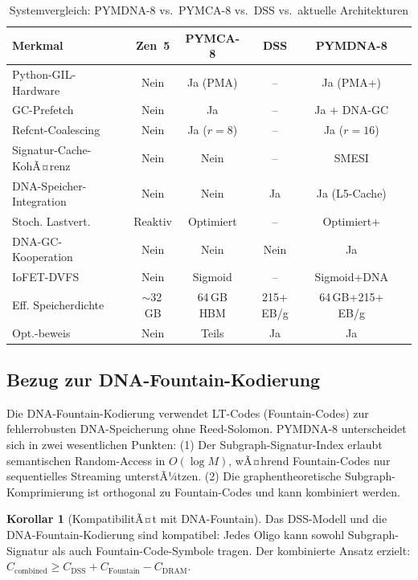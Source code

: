 ﻿\documentclass[a4paper,12pt]{article}
\theoremstyle{definition}
\newtheorem{korollar}{Korollar}[section]
\begin{document}
\begin{table}[H]
  \centering
  \caption{Systemvergleich: PYMDNA-8 vs.\ PYMCA-8 vs.\ DSS vs.\ aktuelle Architekturen}
  \label{tab:systemvergleich}
  \renewcommand{\arraystretch}{1.35}
  \begin{tabular}{p{4cm}ccccc}
    \toprule
    \textbf{Merkmal} & \textbf{Zen~5}
    & \textbf{PYMCA-8} & \textbf{DSS}
    & \textbf{PYMDNA-8} \\
    \midrule
    Python-GIL-Hardware & Nein & Ja (PMA) & -- & Ja (PMA+) \\
    GC-Prefetch & Nein & Ja & -- & Ja + DNA-GC \\
    Refcnt-Coalescing & Nein & Ja ($r=8$) & -- & Ja ($r=16$) \\
    Signatur-Cache-KohÃ¤renz & Nein & Nein & -- & SMESI \\
    DNA-Speicher-Integration & Nein & Nein & Ja & Ja (L5-Cache) \\
    Stoch. Lastvert. & Reaktiv & Optimiert & -- & Optimiert+ \\
    DNA-GC-Kooperation & Nein & Nein & Nein & Ja \\
    IoFET-DVFS & Nein & Sigmoid & -- & Sigmoid+DNA \\
    Eff. Speicherdichte & $\sim$32\,GB & 64\,GB HBM & 215+ EB/g & 64\,GB+215+ EB/g \\
    Opt.-beweis & Nein & Teils & Ja & Ja \\
    \bottomrule
  \end{tabular}
\end{table}

\subsection{Bezug zur DNA-Fountain-Kodierung}

Die DNA-Fountain-Kodierung \cite{erlich2017foundation} verwendet LT-Codes
(Fountain-Codes) zur fehlerrobusten DNA-Speicherung ohne Reed-Solomon.
PYMDNA-8 unterscheidet sich in zwei wesentlichen Punkten:
(1) Der Subgraph-Signatur-Index erlaubt semantischen Random-Access in $O(\log M)$,
wÃ¤hrend Fountain-Codes nur sequentielles Streaming unterstÃ¼tzen.
(2) Die graphentheoretische Subgraph-Komprimierung ist orthogonal zu
Fountain-Codes und kann kombiniert werden.

\begin{korollar}[KompatibilitÃ¤t mit DNA-Fountain]
  Das DSS-Modell und die DNA-Fountain-Kodierung sind kompatibel:
  Jedes Oligo kann sowohl Subgraph-Signatur als auch Fountain-Code-Symbole
  tragen. Der kombinierte Ansatz erzielt:
  $C_{\mathrm{combined}} \ge C_{\mathrm{DSS}} + C_{\mathrm{Fountain}} - C_{\mathrm{DRAM}}$.
\end{korollar}
\end{document}
